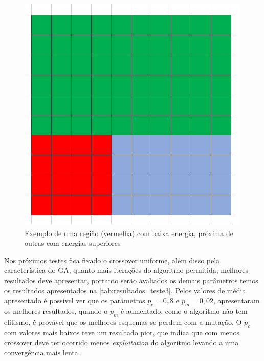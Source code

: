 \begin{figure}[ht]
	\centering
	\includegraphics[width=0.5\linewidth]{imagens/Mapa_ising.png}
	\caption{Exemplo de uma região (vermelha) com baixa energia, próxima de outras com energias superiores}
	\label{fig:Map_ising}
\end{figure}

Nos próximos testes fica fixado o crossover uniforme, além disso pela característica do GA, quanto mais iterações do algoritmo permitida, melhores resultados deve apresentar, portanto serão avaliados os demais parâmetros temos os resultados apresentados na \autoref{tab:resultados_teste3}. Pelos valores de média apresentado é possível ver que os parâmetros \(p_c = 0,8\) e \(p_m = 0,02\), apresentaram os melhores resultados, quando o \(p_m\) é aumentado, como o algoritmo não tem elitismo, é provável que os melhores esquemas se perdem com a mutação. O \(p_c\) com valores mais baixos teve um resultado pior, que indica que com menos crossover deve ter ocorrido menos \textit{exploitation} do algoritmo levando a uma convergência mais lenta.

